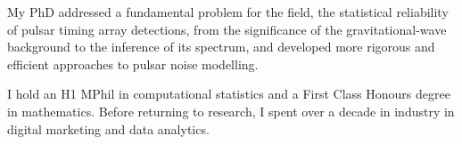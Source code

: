 \documentclass[a4paper,12pt]{article}
\makeatletter
\newenvironment{jobshort}[2]
    {
    \begin{tabularx}{\linewidth}{@{}l X r@{}}
    \textbf{#1} & \hfill &  #2 \\[3.75pt]
    \end{tabularx}
    }
    {
    }
\newenvironment{joblong}[2]
    {
    \begin{tabularx}{\linewidth}{@{}l X r@{}}
    \textbf{#1} & \hfill &  #2 \\[3.75pt]
    \end{tabularx}
    \begin{minipage}[t]{\linewidth}
    \begin{itemize}[nosep,after=\strut, leftmargin=1em, itemsep=3pt,label=--]
    }
    {
    \end{itemize}
    \end{minipage}    
    }
\makeatother
\begin{document}
My PhD addressed a fundamental problem for the field, the statistical reliability of pulsar timing array detections, from the significance of the gravitational-wave background to the inference of its spectrum, and developed more rigorous and efficient approaches to pulsar noise modelling.

I hold an H1 MPhil in computational statistics and a First Class Honours degree in mathematics. 
Before returning to research, I spent over a decade in industry in digital marketing and data analytics.




  

\end{document}
